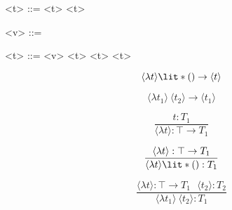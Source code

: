 \documentclass[11hpt]{article}
\begin{document}
\begin{grammar}

<\lambda t> ::= \lit*{() ->} <t>
  \alt \lit*{->} <t>

<v> ::= 
  \alt {}

<t> ::= <v>
  \alt <\lambda t>\lit*{()}
  \alt <\lambda t> <t>

\end{grammar}

\begin{equation}
\langle\lambda t\rangle \lit*{()} \to \langle t \rangle
\end{equation}

\begin{equation}
\langle\lambda t_{1}\rangle \ \langle t_{2} \rangle \to \langle t_{1} \rangle
\end{equation}

\begin{equation}
\frac{t : T_{1}}{\langle \lambda t \rangle: \top \to T_{1}}
\end{equation}

\begin{equation}
\dfrac{\langle\lambda t\rangle : \top \to T_{1}}{\langle\lambda t\rangle \lit*{()}: T_{1}}
\end{equation}

\begin{equation}
\frac{\langle \lambda t \rangle : \top \to T_{1} \ \ \ \langle t_{2} \rangle : T_{2} }{\langle\lambda t_{1}\rangle \ \langle t_{2} \rangle : T_{1}}
\end{equation}
\end{document}
